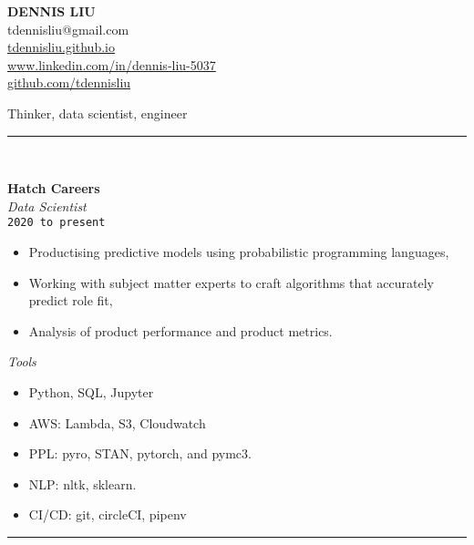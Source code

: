 \documentclass{article}
\newcommand{\HRule}{\rule{\linewidth}{0.5mm}}
\begin{document}
\begin{center} 

\textbf{\huge{DENNIS LIU}}
\\[0.5cm]

tdennisliu@gmail.com \\
\url{tdennisliu.github.io}\\
\small{\url{www.linkedin.com/in/dennis-liu-5037}} \\
\small{\url{github.com/tdennisliu}}

\end{center}
\begin{flushright}
Thinker, data scientist, engineer
\end{flushright}

\HRule \\
\begin{multicols}{2}
\textbf{\large Hatch Careers}\\
\emph{Data Scientist}\\
 \texttt{2020 to present}
\begin{itemize}
	\item Productising predictive models using probabilistic programming languages,
	\item Working with subject matter experts to craft algorithms that accurately predict role fit,
	\item Analysis of product performance and product metrics.\\
\end{itemize}

\emph{Tools}

\begin{itemize}
\item Python, SQL, Jupyter
\item AWS: Lambda, S3, Cloudwatch
\item PPL: pyro, STAN, pytorch, and pymc3.
\item NLP: nltk, sklearn.
\item CI/CD: git, circleCI, pipenv
\end{itemize}


\end{multicols}
\HRule
\end{document}
